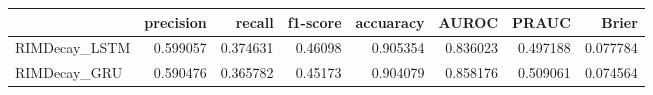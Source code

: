 \begin{tabular}{lrrrrrrr}
\toprule
{} &  precision &    recall &  f1-score &  accuaracy &     AUROC &     PRAUC &     Brier \\
\midrule
RIMDecay\_LSTM &   0.599057 &  0.374631 &   0.46098 &   0.905354 &  0.836023 &  0.497188 &  0.077784 \\
RIMDecay\_GRU  &   0.590476 &  0.365782 &   0.45173 &   0.904079 &  0.858176 &  0.509061 &  0.074564 \\
\bottomrule
\end{tabular}
